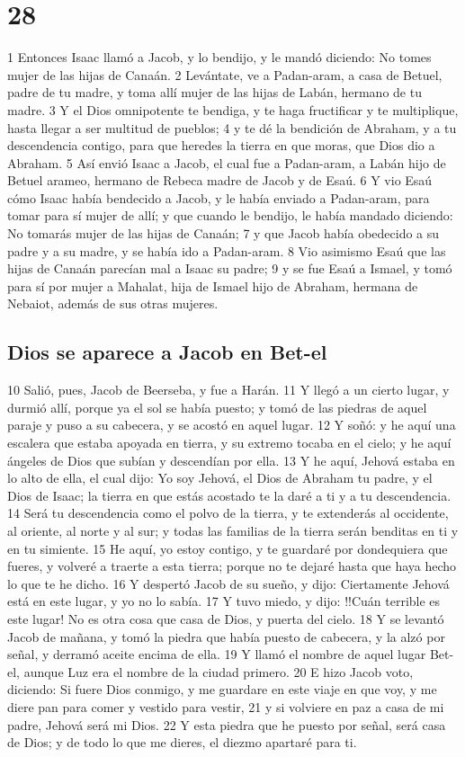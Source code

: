 \chapter{28}

1 Entonces Isaac llamó a Jacob, y lo bendijo, y le mandó diciendo: No tomes mujer de las hijas de Canaán.
2 Levántate, ve a Padan-aram, a casa de Betuel, padre de tu madre, y toma allí mujer de las hijas de Labán, hermano de tu madre.
3 Y el Dios omnipotente te bendiga, y te haga fructificar y te multiplique, hasta llegar a ser multitud de pueblos;
4 y te dé la bendición de Abraham, y a tu descendencia contigo, para que heredes la tierra en que moras, que Dios dio a Abraham.
5 Así envió Isaac a Jacob, el cual fue a Padan-aram, a Labán hijo de Betuel arameo, hermano de Rebeca madre de Jacob y de Esaú.
6 Y vio Esaú cómo Isaac había bendecido a Jacob, y le había enviado a Padan-aram, para tomar para sí mujer de allí; y que cuando le bendijo, le había mandado diciendo: No tomarás mujer de las hijas de Canaán;
7 y que Jacob había obedecido a su padre y a su madre, y se había ido a Padan-aram.
8 Vio asimismo Esaú que las hijas de Canaán parecían mal a Isaac su padre;
9 y se fue Esaú a Ismael, y tomó para sí por mujer a Mahalat, hija de Ismael hijo de Abraham, hermana de Nebaiot, además de sus otras mujeres.

\section{Dios se aparece a Jacob en Bet-el}

10 Salió, pues, Jacob de Beerseba, y fue a Harán.
11 Y llegó a un cierto lugar, y durmió allí, porque ya el sol se había puesto; y tomó de las piedras de aquel paraje y puso a su cabecera, y se acostó en aquel lugar.
12 Y soñó: y he aquí una escalera que estaba apoyada en tierra, y su extremo tocaba en el cielo; y he aquí ángeles de Dios que subían y descendían por ella.
13 Y he aquí, Jehová estaba en lo alto de ella, el cual dijo: Yo soy Jehová, el Dios de Abraham tu padre, y el Dios de Isaac; la tierra en que estás acostado te la daré a ti y a tu descendencia.
14 Será tu descendencia como el polvo de la tierra, y te extenderás al occidente, al oriente, al norte y al sur; y todas las familias de la tierra serán benditas en ti y en tu simiente.
15 He aquí, yo estoy contigo, y te guardaré por dondequiera que fueres, y volveré a traerte a esta tierra; porque no te dejaré hasta que haya hecho lo que te he dicho.
16 Y despertó Jacob de su sueño, y dijo: Ciertamente Jehová está en este lugar, y yo no lo sabía.
17 Y tuvo miedo, y dijo: !!Cuán terrible es este lugar! No es otra cosa que casa de Dios, y puerta del cielo.
18 Y se levantó Jacob de mañana, y tomó la piedra que había puesto de cabecera, y la alzó por señal, y derramó aceite encima de ella.
19 Y llamó el nombre de aquel lugar Bet-el, aunque Luz era el nombre de la ciudad primero.
20 E hizo Jacob voto, diciendo: Si fuere Dios conmigo, y me guardare en este viaje en que voy, y me diere pan para comer y vestido para vestir,
21 y si volviere en paz a casa de mi padre, Jehová será mi Dios.
22 Y esta piedra que he puesto por señal, será casa de Dios; y de todo lo que me dieres, el diezmo apartaré para ti.

